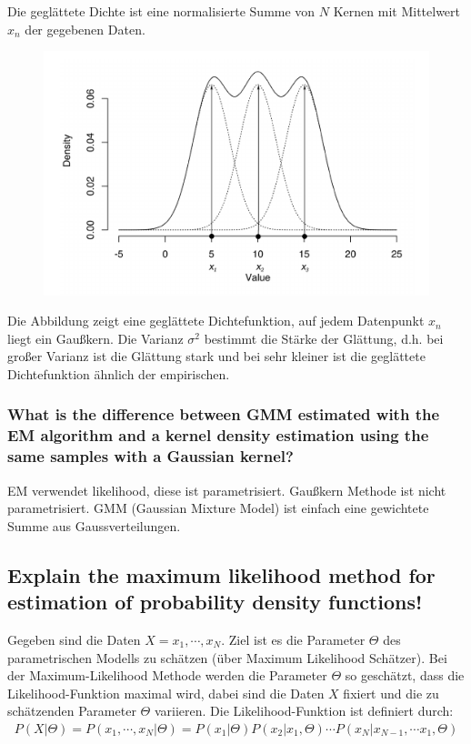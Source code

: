 \documentclass[12pt]{scrartcl}
\begin{document}
Die geglättete Dichte ist eine normalisierte Summe von $N$ Kernen mit Mittelwert $x_n$ der gegebenen Daten.
\begin{figure}[htb]
  \begin{center}
  \includegraphics[scale=0.35]{dichte}
  \end{center}
  \vspace{-\baselineskip}
\end{figure}
Die Abbildung zeigt eine geglättete Dichtefunktion, auf jedem Datenpunkt $x_n$ liegt ein Gaußkern. Die Varianz $\sigma^2$ bestimmt die Stärke der Glättung, d.h. bei großer Varianz ist die Glättung stark und bei sehr kleiner ist die geglättete Dichtefunktion ähnlich der empirischen.

\subsubsection{What is the difference between GMM estimated with the EM algorithm and a kernel density estimation using the same samples with a Gaussian kernel?}

EM verwendet likelihood, diese ist parametrisiert. Gaußkern Methode ist nicht parametrisiert. GMM (Gaussian Mixture Model) ist einfach eine gewichtete Summe aus Gaussverteilungen.

\subsection{Explain the maximum likelihood method for estimation of probability density functions!}
\label{ML}
Gegeben sind die Daten $X = x_1, \cdots ,x_N$. Ziel ist es die Parameter $\Theta$ des parametrischen Modells zu schätzen (über Maximum Likelihood Schätzer). Bei der Maximum-Likelihood Methode werden die Parameter $\Theta$ so geschätzt, dass die Likelihood-Funktion maximal wird, dabei sind die Daten $X$ fixiert und die zu schätzenden Parameter $\Theta$ variieren.
Die Likelihood-Funktion ist definiert durch:
\begin{align*}
P(X|\Theta) = P(x_1, \cdots ,x_N | \Theta) = P(x_1|\Theta)P(x_2|x_1,\Theta) \cdots P(x_N|x_{N-1}, \cdots x_1,\Theta)
\end{align*}
\end{document}
